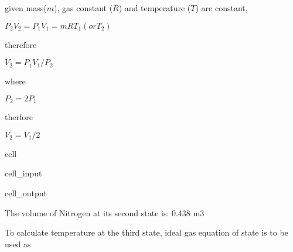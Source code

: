\documentclass[letterpaper,10pt,english]{jupyterBook}
\begin{document}
\sphinxAtStartPar
given mass(\(m\)), gas constant (\(R\)) and temperature (\(T\)) are constant,

\sphinxAtStartPar
\(P_2V_2=P_1V_1=mRT_1(orT_2)\)

\sphinxAtStartPar
therefore

\sphinxAtStartPar
\(V_2=P_1V_1/P_2\)

\sphinxAtStartPar
where

\sphinxAtStartPar
\(P_2=2P_1\)

\sphinxAtStartPar
therfore

\sphinxAtStartPar
\(V_2=V_1/2\)

\begin{sphinxuseclass}{cell}\begin{sphinxVerbatimInput}

\begin{sphinxuseclass}{cell_input}
\begin{sphinxVerbatim}[commandchars=\\\{\}]
     
   
     
  
\end{sphinxVerbatim}

\end{sphinxuseclass}\end{sphinxVerbatimInput}
\begin{sphinxVerbatimOutput}

\begin{sphinxuseclass}{cell_output}
\begin{sphinxVerbatim}[commandchars=\\\{\}]
The volume of Nitrogen at its second state is: 0.438 m3
\end{sphinxVerbatim}

\end{sphinxuseclass}\end{sphinxVerbatimOutput}

\end{sphinxuseclass}
\sphinxAtStartPar
To calculate temperature at the third state, ideal gas equation of state is to be used as
\end{document}
